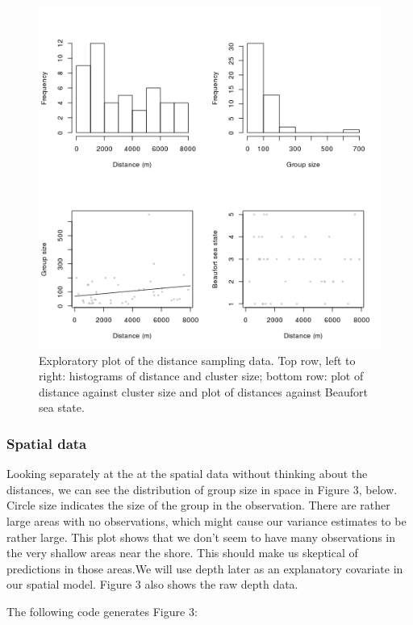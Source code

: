 \documentclass[]{amsart}
\makeatletter
\def\maxwidth{\ifdim\Gin@nat@width>\linewidth\linewidth
\else\Gin@nat@width\fi}
\let\Oldincludegraphics\includegraphics
\renewcommand{\includegraphics}[1]{\Oldincludegraphics[width=\maxwidth]{#1}}
\makeatother
\begin{document}
\begin{figure}[htbp]
\centering
\includegraphics{mexico-figs/EDA-plots.png}
\caption{Exploratory plot of the distance sampling data. Top row, left
to right: histograms of distance and cluster size; bottom row: plot of
distance against cluster size and plot of distances against Beaufort sea
state.}
\end{figure}

\subsubsection{Spatial data}

Looking separately at the at the spatial data without thinking about the
distances, we can see the distribution of group size in space in Figure
3, below. Circle size indicates the size of the group in the
observation. There are rather large areas with no observations, which
might cause our variance estimates to be rather large. This plot shows
that we don't seem to have many observations in the very shallow areas
near the shore. This should make us skeptical of predictions in those
areas.We will use depth later as an explanatory covariate in our spatial
model. Figure 3 also shows the raw depth data.

The following code generates Figure 3:
\end{document}
